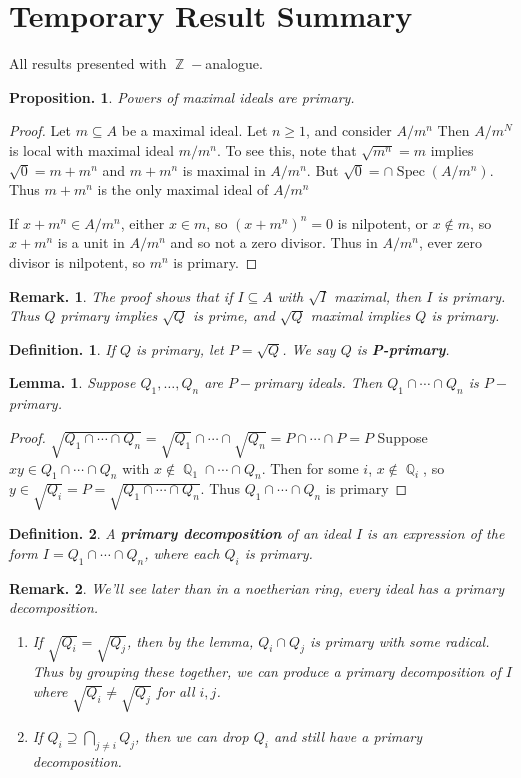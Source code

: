 \documentclass[11pt, a4paper]{memoir}
\DeclareMathOperator{\Q}{{\mathbb{Q}}}
\DeclareMathOperator{\Z}{{\mathbb{Z}}}
\theoremstyle{change}
\newtheorem{lemma}[theorem]{Lemma.}
\newtheorem{proposition}[theorem]{Proposition.}
\theoremstyle{plain}
\theoremstyle{nonumberplain}
\newtheorem{definition}{Definition.}
\newtheorem{remark}{Remark.}
\newtheorem{proof}{Proof}
\DeclareMathOperator{\Spec}{Spec}
\numberwithin{equation}{section}
\begin{document}
\section{Temporary Result Summary}
All results presented with $\Z-$analogue.
\begin{proposition}
    Powers of maximal ideals are primary.
\end{proposition}
\begin{proof}
    Let $m\subseteq A$ be a maximal ideal.
    Let $n\geq 1$, and consider $A/m^n$
    Then $A/m^N$ is local with maximal ideal $m/m^n$.
    To see this, note that $\sqrt{m^n}=m$ implies $\sqrt{0}=m+m^n$ and $m+m^n$ is maximal in $A/m^n$.
    But $\sqrt{0}=\cap\Spec(A/m^n)$.
    Thus $m+m^n$ is the only maximal ideal of $A/m^n$

    If $x+m^n\in A/m^n$, either $x\in m$, so $(x+m^n)^n=0$ is nilpotent, or $x\notin m$, so $x+m^n$ is a unit in $A/m^n$ and so not a zero divisor.
    Thus in $A/m^n$, ever zero divisor is nilpotent, so $m^n$ is primary.
\end{proof}
\begin{remark}
    The proof shows that if $I\subseteq A$ with $\sqrt{I}$ maximal, then $I$ is primary.
    Thus $Q$ primary implies $\sqrt{Q}$ is prime, and $\sqrt{Q}$ maximal implies $Q$ is primary.
\end{remark}
\begin{definition}
    If $Q$ is primary, let $P=\sqrt{Q}$.
    We say $Q$ is \textbf{P-primary}.
\end{definition}
\begin{lemma}
    Suppose $Q_1,\ldots,Q_n$ are $P-$primary ideals.
    Then $Q_1\cap\cdots\cap Q_n$ is $P-$primary.
\end{lemma}
\begin{proof}
    $\sqrt{Q_1\cap\cdots\cap Q_n}=\sqrt{Q_1}\cap\cdots\cap\sqrt{Q_n}=P\cap\cdots \cap P=P$
    Suppose $xy\in Q_1\cap\cdots\cap Q_n$ with $x\notin\Q_1\cap\cdots\cap Q_n$.
    Then for some $i$, $x\notin\Q_i$, so $y\in\sqrt{Q_i}=P=\sqrt{Q_1\cap\cdots\cap Q_n}$.
    Thus $Q_1\cap\cdots\cap Q_n$ is primary
\end{proof}
\begin{definition}
    A \textbf{primary decomposition} of an ideal $I$ is an expression of the form $I=Q_1\cap\cdots\cap Q_n$, where each $Q_i$ is primary.
\end{definition}
\begin{remark}
    We'll see later than in a noetherian ring, every ideal has a primary decomposition.
    \begin{enumerate}
        \item If $\sqrt{Q_i}=\sqrt{Q_j}$, then by the lemma, $Q_i\cap Q_j$ is primary with some radical.
            Thus by grouping these together, we can produce a primary decomposition of $I$ where $\sqrt{Q_i}\neq\sqrt{Q_j}$ for all $i,j$.
        \item If $Q_i\supseteq\bigcap_{j\neq i}Q_j$, then we can drop $Q_i$ and still have a primary decomposition.
    \end{enumerate}
\end{remark}
\end{document}
